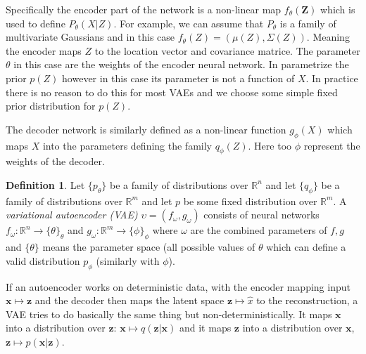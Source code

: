 \documentclass[11pt, a4paper]{report}
\theoremstyle{plain}
\theoremstyle{definition}
\newtheorem{mydef}{Definition}[chapter]
\theoremstyle{remark}
\newcommand{\R}{\mathbb{R}}
\newcommand{\x}{\mathbf{x}}
\newcommand{\Z}{\mathbf{Z}}
\newcommand{\z}{\mathbf{z}}
\begin{document}
Specifically the encoder part of the network is a non-linear map $f_{\theta}(\Z)$ which is
used to define $P_{\theta}(X|Z)$. For example, we can assume that $P_{\theta}$
is a family of multivariate Gaussians and in this case $f_{\theta}(Z) =
(\mu(Z), \Sigma(Z))$. Meaning the encoder maps $Z$ to the location vector and
covariance matrice. The parameter $\theta$ in this case are the weights of the
encoder neural network. In parametrize the prior $p(Z)$ however in this case its
parameter is not a function of $X$. In practice there is no reason to do this
for most VAEs and we choose some simple fixed prior distribution for $p(Z)$.

The decoder network is similarly defined as a non-linear function $g_{\phi}(X)$ which
maps $X$ into the parameters defining the family $q_{\phi}(Z)$. Here too $\phi$
represent the weights of the decoder.

\begin{mydef}
\label{def:vae}
Let $\{p_{\theta}\}$ be a family of distributions over $\R^n$ and let
$\{q_{\phi}\}$ be a family of distributions over $\R^m$ and let $p$ be some
fixed distribution over $\R^m$. A \emph{variational autoencoder (VAE)} $\upsilon
= (f_{\omega}, g_{\omega})$ consists of neural networks $f_{\omega}: \R^n \to
\{\theta\}_{\theta}$ and $g_{\omega}: \R^m \to \{\phi\}_{\phi}$ where $\omega$
are the combined parameters of $f,g$ and $\{\theta \}$ means the parameter space
(all possible values of $\theta$ which can define a valid distribution
$p_{\phi}$ (similarly with $\phi$). \end{mydef}




If an autoencoder works on deterministic data, 
with the encoder mapping input $\x \mapsto \z$ and the decoder then maps the
latent space $\z \mapsto \hat{x}$ to the reconstruction, a VAE tries to do
basically the same thing but non-deterministically.
It maps $\x$ into a distribution over $\z$: $\x \mapsto q(\z|\x)$ and it maps
$\z$ into a distribution over $\x$, $\z \mapsto p(\x|\z)$.
\end{document}
